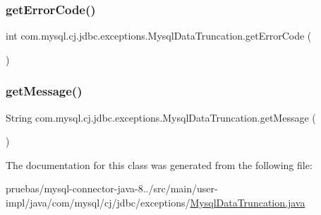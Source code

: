 \subsubsection{\texorpdfstring{get\+Error\+Code()}{getErrorCode()}}
{\footnotesize\ttfamily int com.\+mysql.\+cj.\+jdbc.\+exceptions.\+Mysql\+Data\+Truncation.\+get\+Error\+Code (\begin{DoxyParamCaption}{ }\end{DoxyParamCaption})}

\mbox{\label{classcom_1_1mysql_1_1cj_1_1jdbc_1_1exceptions_1_1_mysql_data_truncation_a9879279a524e5c4f03fba46107925891}} 
\subsubsection{\texorpdfstring{get\+Message()}{getMessage()}}
{\footnotesize\ttfamily String com.\+mysql.\+cj.\+jdbc.\+exceptions.\+Mysql\+Data\+Truncation.\+get\+Message (\begin{DoxyParamCaption}{ }\end{DoxyParamCaption})}



The documentation for this class was generated from the following file\+:\begin{DoxyCompactItemize}
\item 
pruebas/mysql-\/connector-\/java-\/8../src/main/user-\/impl/java/com/mysql/cj/jdbc/exceptions/\mbox{\hyperlink{_mysql_data_truncation_8java}{Mysql\+Data\+Truncation.\+java}}\end{DoxyCompactItemize}
